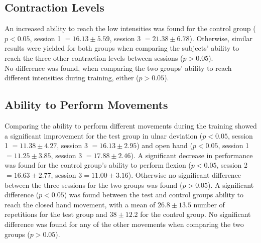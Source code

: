 \subsection{Contraction Levels}
An increased ability to reach the low intensities was found for the control group ($p < 0.05$, session 1 $ = 16.13 \pm 5.59$, session 3  $ = 21.38 \pm 6.78$). Otherwise, similar results were yielded for both groups when comparing the subjects' ability to reach the three other contraction levels between sessions ($p > 0.05$).\\ No difference was found, when comparing the two groups' ability to reach different intensities during training, either ($p > 0.05$).

\subsection{Ability to Perform Movements}
Comparing the ability to perform different movements during the training showed a significant improvement for the test group in ulnar deviation ($p < 0.05$, session 1 $ = 11.38 \pm 4.27$, session 3 $ = 16.13 \pm 2.95$) and open hand ($p < 0.05$, session 1 $ = 11.25 \pm 3.85$, session 3 $ = 17.88 \pm 2.46$). A significant decrease in performance was found for the control group's ability to perform flexion ($p < 0.05$, session 2$ = 16.63 \pm 2.77$, session 3$ = 11.00 \pm 3.16$). Otherwise no significant difference between the three sessions for the two groups was found ($p > 0.05$). 
A significant difference ($p < 0.05$) was found between the test and control groups ability to reach the closed hand movement, with a mean of $26.8 \pm13.5$ number of repetitions for the test group and $38 \pm12.2$ for the control group. No significant difference was found for any of the other movements when comparing the two groups ($p > 0.05$).
%
